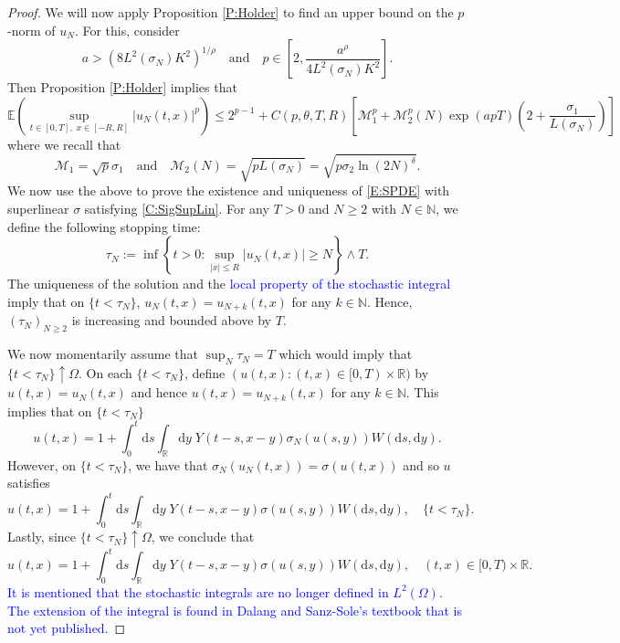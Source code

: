 \documentclass[a4paper,11pt]{article}
\numberwithin{equation}{section}
\theoremstyle{plain}
\theoremstyle{definition}
\newcommand{\ud}{\ensuremath{\mathrm{d} }}
\newcommand{\R}{\mathbb{R}}
\numberwithin{NQ}{section}
\numberwithin{LQ}{section}
\numberwithin{ZQ}{section}
\begin{document}
\begin{proof}
		We will now apply Proposition \ref{P:Holder} to find an upper bound on the $p$-norm of $u_N$. For this, consider 
		\[
		a > \left( 8 L^2(\sigma_N) K^2 \right)^{1/\rho} \quad \text{and} \quad p \in \left[ 2, \frac{a^{ \rho}}{4L^2(\sigma_N)K^2} \right].
		\] 
		Then Proposition \ref{P:Holder} implies that 
		\begin{equation}
		\label{E:u_NMomBdd}
		\mathbb{E}\left(\sup_{t\in[0,T],\; x\in[-R,R]} |u_N(t,x)|^p\right) \le 2^{p-1} + C(p, \theta, T,R)\left[\mathcal{M}_1^p + \mathcal{M}_2^p(N) \exp(apT)\left(2+ \frac{\sigma_1}{L(\sigma_N)}\right)\right]
		\end{equation}
		where we recall that 
		\begin{equation}
		\label{D:M1&2forSig_N}
		\mathcal{M}_1 = \sqrt{p}\sigma_1 \quad \text{and} \quad \mathcal{M}_2(N) = \sqrt{pL(\sigma_N)} = \sqrt{p\sigma_2\ln(2N)^\delta}.
		\end{equation}
		We now use the above to prove the existence and uniqueness of \eqref{E:SPDE} with superlinear $\sigma$ satisfying \eqref{C:SigSupLin}. For any $T>0$ and $N \ge 2$ with $N\in \mathbb{N}$, we define the following stopping time:
		\begin{equation}
		\tau_N := \inf \left\{ t>0 : \sup_{|x| \le R} |u_N(t,x)| \ge N \right\} \wedge T.
		\end{equation}
		The uniqueness of the solution and the \textcolor{blue}{local property of the stochastic integral} imply that on $\{t < \tau_N\}$, $u_N(t,x) = u_{N+k}(t,x)$ for any $k \in \mathbb{N}$. Hence, $(\tau_N)_{N \ge 2}$ is increasing and bounded above by $T$. 
		
		We now momentarily assume that $\sup_N \tau_N = T$ which would imply that $\{t < \tau_N \} \uparrow \Omega$. On each $\{ t < \tau_N \}$, define $(u(t,x) : (t,x) \in [0,T) \times \R)$ by $u(t,x) = u_N(t,x)$ and hence $u(t,x) = u_{N+k}(t,x)$ for any $k\in \mathbb{N}$. This implies that on $\{ t < \tau_N \}$ 
		\[
		u(t,x) = 1 + \int_0^t \ud s \int_{\R} \ud y \; Y(t-s,x-y) \sigma_N(u(s,y)) W(\ud s, \ud y).
		\]
		However, on $\{ t < \tau_N \}$, we have that $\sigma_N(u_N(t,x)) = \sigma(u(t,x))$ and so $u$ satisfies
		\[
		u(t,x) = 1 + \int_0^t \ud s \int_{\R} \ud y \; Y(t-s,x-y) \sigma(u(s,y)) W(\ud s, \ud y), \quad \{ t < \tau_N \}.
		\]
		Lastly, since $\{ t < \tau_N \} \uparrow \Omega$, we conclude that 
		\begin{equation}
		\label{E:SupLinMildSol}
		u(t,x) = 1 + \int_0^t \ud s \int_{\R} \ud y \; Y(t-s,x-y) \sigma(u(s,y)) W(\ud s, \ud y), \quad (t,x) \in [0,T) \times \R.
		\end{equation}
		\textcolor{blue}{It is mentioned that the stochastic integrals are no longer defined in $L^2(\Omega)$. The extension of the integral is found in Dalang and Sanz-Sole's textbook that is not yet published.}
		

\end{proof}
\end{document}
